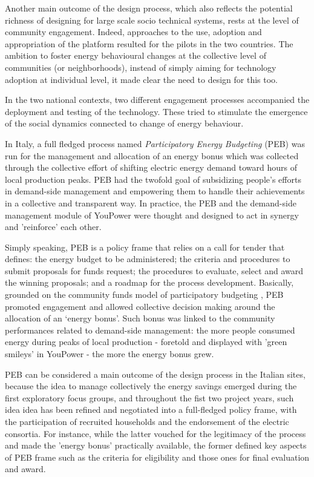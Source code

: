 Another main outcome of the design process, which also reflects the potential richness of designing for large scale socio technical systems, rests at the level of community engagement. Indeed, approaches to the
use, adoption and appropriation of the platform resulted for the pilots in the two countries. 
The ambition to foster energy behavioural changes at the collective level of communities (or neighborhoods),
instead of simply aiming for technology adoption at individual level, it made clear the need to design for
this too.

In the two national contexts, two different engagement processes accompanied the deployment and testing of the technology. These tried to stimulate the emergence of the social dynamics connected to change of energy behaviour. 

In Italy, a full fledged process named \textit{Participatory Energy Budgeting} (PEB) \cite{capaccioli_exploring_2017,capaccioli_exploring_2016}
was run for the management and allocation of an energy bonus which was
collected through the collective effort of shifting electric energy demand
toward hours of local production peaks.
PEB had the twofold goal of subsidizing people's efforts in demand-side management
and empowering them to handle their achievements in a collective and transparent way.
In practice, the PEB and the demand-side management module of YouPower
were thought and designed to act in synergy and 'reinforce' each other.

Simply speaking, PEB is a policy frame that relies on a call for tender that
defines: the energy budget to be administered;
the criteria and procedures to submit proposals for funds request; the procedures
to evaluate, select and award the winning proposals; and a roadmap for the process development. 
Basically, grounded on the community funds model of participatory budgeting \cite{Ganuza2012,Sintomer2008},
PEB promoted engagement and allowed collective decision
making around the allocation of an `energy bonus'. Such bonus
was linked to the community performances related to demand-side management:
the more people consumed energy during peaks of local production - foretold and displayed
with 'green smileys' in YouPower - the more the energy bonus grew.

PEB can be considered a main outcome of the design process in the Italian sites, because 
the idea to manage collectively the energy savings emerged during the first exploratory focus groups,
and throughout the fist two project years, such idea idea has been refined and negotiated into
a full-fledged policy frame, with the participation of recruited households and the endorsement
of the electric consortia. For instance, while the latter vouched for the legitimacy of the process
and made the 'energy bonus' practically available, the former defined key aspects of PEB frame such as the criteria for eligibility and those ones for final evaluation and award.  


